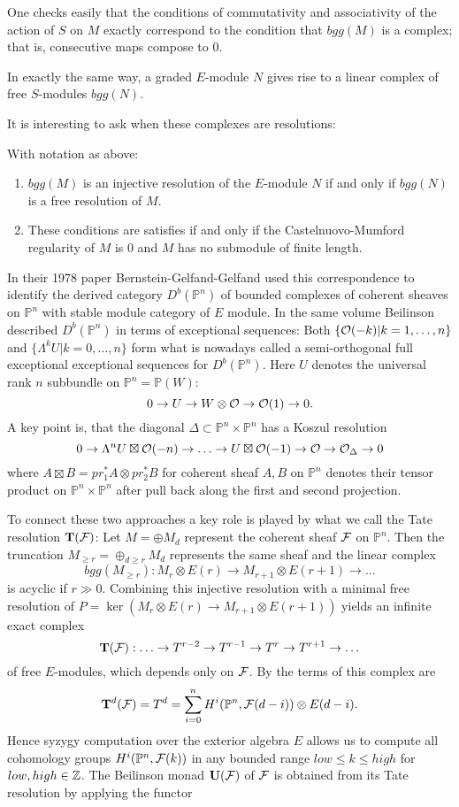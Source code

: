 \documentclass[twoside,12pt, leqno]{amsart}
\def\PP{{\mathbb P}}
\def\bT{{\bf T}}
\def\bU{{\bf U}}
\begin{document}
One checks easily that the conditions of commutativity and associativity of the action of $S$ on $M$ exactly correspond to the condition that $bgg(M)$ is a complex; that is, consecutive maps compose to 0.

In exactly the same way, a graded $E$-module $N$ gives rise to a linear  complex of free $S$-modules
$bgg(N)$.


It is interesting to ask when these complexes are resolutions:

\begin{theorem} With notation as above:
\begin{enumerate}
 \item $bgg(M)$ is an injective resolution of the $E$-module $N$ if and only if
$bgg(N)$ is a free resolution of $M$.

\item These conditions are satisfies if and only if the Castelnuovo-Mumford regularity of $M$ is 0 and $M$ has no submodule of finite length.
\end{enumerate}
\end{theorem}


In their 1978 paper Bernstein-Gelfand-Gelfand \cite{BGG} used this correspondence  to identify  the derived category $D^b(\PP^n)$ of bounded complexes of coherent sheaves on $\PP^n$ with stable module category of $E$ module. In the same volume Beilinson \cite{Bei} described
$D^b(\PP^n)$ in terms of exceptional sequences:
Both $\{ {\mathcal O}(-k) | k=1,\ldots,n\}$ and 
$\{ \Lambda^k U | k=0, \ldots, n\}$ form  what is nowadays called  a semi-orthogonal full exceptional exceptional sequences for $D^b(\PP^n)$.
Here $U$ denotes the universal rank $n$ subbundle on $\PP^n=\PP(W)$:
$$ 0 \to U \to W\otimes {\mathcal O} \to {\mathcal O}(1) \to 0.$$ 
A key point is, that the diagonal $\Delta \subset \PP^n \times \PP^n$ has a Koszul resolution
$$ 
0 \to \Lambda^n U \boxtimes {\mathcal O}(-n) \to \ldots \to U \boxtimes {\mathcal O}(-1) \to {\mathcal O} \to {\mathcal O}_\Delta \to 0
$$
where $A \boxtimes B = pr_1^* A \otimes pr_2^* B$ for  coherent sheaf $A,B$ on $\PP^n$ denotes their tensor product on $\PP^n \times \PP^n$ after pull back along the first and second projection.

To connect these two approaches a key role is played by what we call the Tate resolution $\bf T({\mathcal F})$: Let $M=\oplus M_d$ represent the coherent sheaf ${\mathcal F}$ on $\PP^n$. Then the truncation $M_{\ge r} = \oplus_{d \ge r}M_d$ represents the same sheaf and the linear complex
$$bgg(M_{\ge r}) : M_r\otimes E(r) \to M_{r+1}\otimes E(r+1) \to \ldots$$ 
is acyclic if $r \gg 0$. Combining this injective resolution with a minimal free resolution of $P=\ker(M_r\otimes E(r) \to M_{r+1}\otimes E(r+1))$
yields an infinite exact complex
$$
\bT(\sF):   \ldots \to T^{r-2} \to T^{r-1} \to T^r \to T^{r+1} \to \ldots
$$
of free $E$-modules, which depends only on ${\mathcal F}$. By \cite[Theorem x.y] {EFS} the terms of this complex are
$$\bT^d(\sF) =T^d= \sum_{i=0}^n H^i(\PP^n,\sF(d-i)) \otimes E(d-i).$$
 Hence syzygy computation over the exterior algebra $E$ allows us to compute all cohomology groups $H^i(\PP^n,\sF(k))$ in any bounded range $low \le k \le high$ for $low,high \in {\mathbb Z}$.
  The Beilinson monad $\bU(\sF)$ of ${\mathcal F}$ is obtained from its Tate resolution by applying the functor
 
\end{document}

